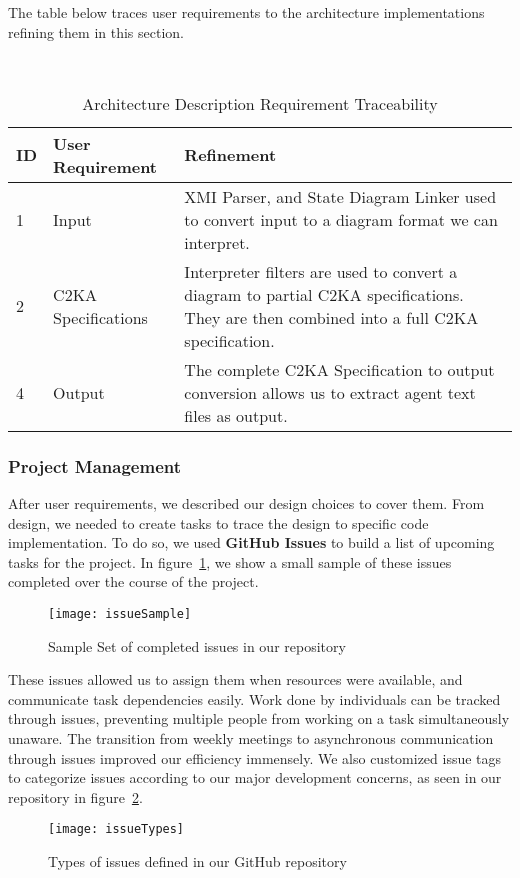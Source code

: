     The table below traces user requirements to the architecture implementations refining them in this section.
    \begin{table}[htbp]
        \centering
        \caption{Architecture Description Requirement Traceability}\label{tab:arch-description-table}\\
        \begin{tabularx}{\textwidth}{| l | l | X |}
            \hline
            \textbf{ID} & \textbf{User Requirement} & \textbf{Refinement} \\
            \hline
            1 & Input & XMI Parser, and State Diagram Linker used to convert input to a diagram format we can interpret. \\ \hline
            2 & C2KA Specifications & Interpreter filters are used to convert a diagram to partial C2KA specifications.
            They are then combined into a full C2KA specification. \\ \hline
            4 & Output & The complete C2KA Specification to output conversion allows us to extract agent text files as output.  \\ \hline
        \end{tabularx}
    \end{table}

    \newpage
    \subsubsection{Project Management}\label{subsubsec:proj-mngmnt}
    After user requirements, we described our design choices to cover them.
    From design, we needed to create tasks to trace the design to specific code implementation.
    To do so, we used \textbf{GitHub Issues} to build a list of upcoming tasks for the project.
    In figure~\ref{fig:sampleIssueList}, we show a small sample of these issues completed over the course of the project.
    \begin{figure}[h]
        \centering
        \texttt{[image: issueSample]}
        \caption{Sample Set of completed issues in our repository}
        \label{fig:sampleIssueList}
    \end{figure}

    These issues allowed us to assign them when resources were available, and communicate task dependencies easily.
    Work done by individuals can be tracked through issues,
    preventing multiple people from working on a task simultaneously unaware.
    The transition from weekly meetings to asynchronous communication through issues improved our efficiency immensely.
    We also customized issue tags to categorize issues
    according to our major development concerns, as seen in our repository in figure~\ref{fig:issueTypes}.
    \begin{figure}[h]
        \centering
        \texttt{[image: issueTypes]}
        \caption{Types of issues defined in our GitHub repository}
        \label{fig:issueTypes}
    \end{figure}


